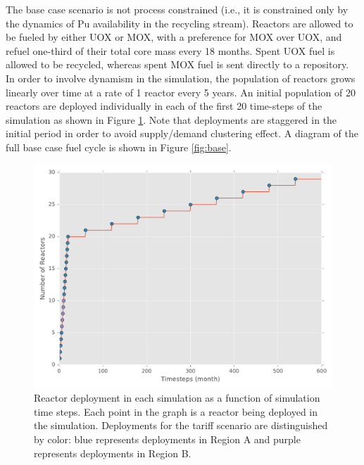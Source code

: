 The base case scenario is not process constrained (i.e., it is constrained only
by the dynamics of Pu availability in the recycling stream). Reactors are
allowed to be fueled by either UOX or MOX, with a preference for MOX over UOX,
and refuel one-third of their total core mass every 18 months. Spent UOX fuel is
allowed to be recycled, whereas spent MOX fuel is sent directly to a
repository. In order to involve dynamism in the simulation, the population
of reactors grows linearly over time at a rate of 1 reactor every 5 years. An
initial population of 20 reactors are deployed individually in each of the first
20 time-steps of the simulation as shown in Figure \ref{fig:deploy}. Note that
deployments are staggered in the initial period in order to avoid supply/demand
clustering effect. A diagram of the full base case fuel cycle is shown in Figure
\ref{fig:base}.

\begin{figure}
  \begin{center}
    \includegraphics[width=0.75\columnwidth]{rxtr_deploy.pdf}
    \caption[]{
      \label{fig:deploy}
      Reactor deployment in each simulation as a function of simulation time
      steps. Each point in the graph is a reactor being deployed in the
      simulation. Deployments for the tariff scenario are distinguished by
      color: blue represents deployments in Region A and purple represents
      deployments in Region B.}
  \end{center}
\end{figure}

